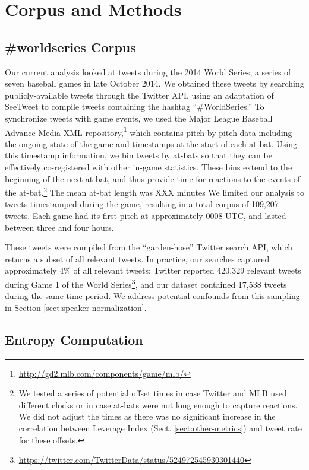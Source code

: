 \documentclass[11pt,letterpaper]{article}
\begin{document}
\section{Corpus and Methods}

\subsection{\#worldseries Corpus}

Our current analysis looked at tweets during the 2014 World Series, a series of seven baseball games in late October 2014.  We obtained these tweets by searching publicly-available tweets through the Twitter API, using an adaptation of SeeTweet \cite{doyle2014} to compile tweets containing the hashtag ``\#WorldSeries.''  To synchronize tweets with game events, we used the Major League Baseball Advance Media XML repository,\footnote{\url{http://gd2.mlb.com/components/game/mlb/}} which contains pitch-by-pitch data including the ongoing state of the game and timestamps at the start of each at-bat. Using this timestamp information, we bin tweets by at-bats so that they can be effectively co-registered with other in-game statistics.  These bins extend to the beginning of the next at-bat, and thus provide time for reactions to the events of the at-bat.\footnote{We tested a series of potential offset times in case Twitter and MLB used different clocks or in case at-bats were not long enough to capture reactions. We did not adjust the times as there was no significant increase in the correlation between Leverage Index (Sect. \ref{sect:other-metrics}) and tweet rate for these offsets.}  The mean at-bat length was XXX minutes  We limited our analysis to tweets timestamped during the game, resulting in a total corpus of 109,207 tweets. Each game had its first pitch at approximately 0008 UTC, and lasted between three and four hours.

These tweets were compiled from the ``garden-hose'' Twitter search API, which returns a subset of all relevant tweets. In practice, our searches captured approximately 4\% of all relevant tweets; Twitter reported 420,329 relevant tweets during Game 1 of the World Series\footnote{\url{https://twitter.com/TwitterData/status/524972545930301440}}, and our dataset contained 17,538 tweets during the same time period.  We address potential confounds from this sampling in Section \ref{sect:speaker-normalization}.

\subsection{Entropy Computation}
\end{document}
